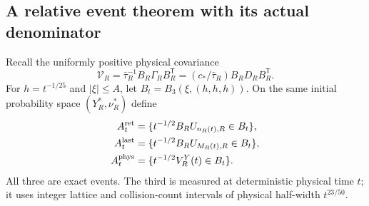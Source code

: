 \subsection{A relative event theorem with its actual denominator}
Recall the uniformly positive physical covariance
\[
 \mathcal V_R=\bar\tau_R^{-1}B_R\Gamma_RB_R^{\mathsf T}
             =(c_*/\bar\tau_R)B_RD_RB_R^{\mathsf T}.
\]
For $h=t^{-1/25}$ and $|\xi|\le A$, let $B_t=B_3(\xi,(h,h,h))$.
On the same initial probability space $(Y_R^*,\nu_R^*)$ define
\begin{align}
 A_t^{\rm ret}&=\{t^{-1/2}B_RU_{n_R(t),R}\in B_t\},\notag\\
 A_t^{\rm last}&=\{t^{-1/2}B_RU_{M_R(t),R}\in B_t\},\notag\\
 A_t^{\rm phys}&=\{t^{-1/2}V_R^Y(t)\in B_t\}.
 \label{eq:three-physical-window-events}
\end{align}
All three are exact events. The third is measured at deterministic
physical time $t$; it uses integer lattice and collision-count
intervals of physical half-width $t^{23/50}$.

